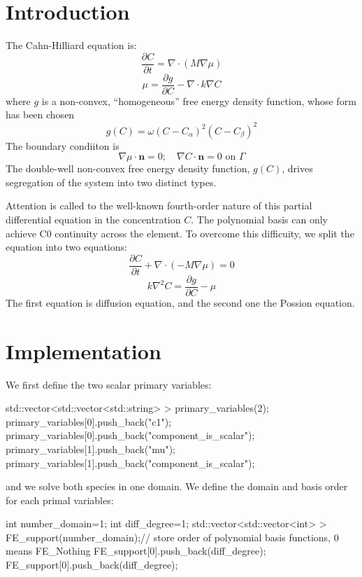 \hypertarget{growth_Introduction}{}\section{Introduction}\label{growth_Introduction}
The Cahn-\/\-Hilliard equation is\-: \[ \frac{\partial C}{\partial t}=\nabla\cdot(M\nabla\mu) \] \[ \mu=\frac{\partial g}{\partial C}-\nabla\cdot k\nabla C \] where $g$ is a non-\/convex, ``homogeneous'' free energy density function, whose form has been chosen \[ g(C)=\omega(C-C_\alpha)^2(C-C_\beta)^2 \] The boundary condiiton is \[ \nabla\mu\cdot\boldsymbol{n}=0;\quad \nabla C\cdot\boldsymbol{n}=0 \text{ on }\Gamma \] The double-\/well non-\/convex free energy density function, $g(C)$, drives segregation of the system into two distinct types.

Attention is called to the well-\/known fourth-\/order nature of this partial differential equation in the concentration $C$. The polynomial basis can only achieve C0 continuity across the element. To overcome this difficuity, we split the equation into two equations\-: \[ \frac{\partial C}{\partial t}+\nabla\cdot(-M\nabla\mu)=0 \] \[ k\nabla^2 C=\frac{\partial g}{\partial C}-\mu \] The first equation is diffusion equation, and the second one the Possion equation. \hypertarget{growth_imple}{}\section{Implementation}\label{growth_imple}
We first define the two scalar primary variables\-: 
\begin{DoxyCode}
std::vector<std::vector<std::string> > primary\_variables(2);        
      primary\_variables[0].push\_back(\textcolor{stringliteral}{"c1"}); primary\_variables[0].push\_back(\textcolor{stringliteral}{"component\_is\_scalar"});
      primary\_variables[1].push\_back(\textcolor{stringliteral}{"mu"}); primary\_variables[1].push\_back(\textcolor{stringliteral}{"component\_is\_scalar"});
\end{DoxyCode}
 and we solve both species in one domain. We define the domain and basis order for each primal variables\-: 
\begin{DoxyCode}
\textcolor{keywordtype}{int} number\_domain=1;
\textcolor{keywordtype}{int} diff\_degree=1;
std::vector<std::vector<int> > FE\_support(number\_domain);\textcolor{comment}{// store order of polynomial basis functions, 0
       means FE\_Nothing   }
FE\_support[0].push\_back(diff\_degree);
FE\_support[0].push\_back(diff\_degree);
\end{DoxyCode}

